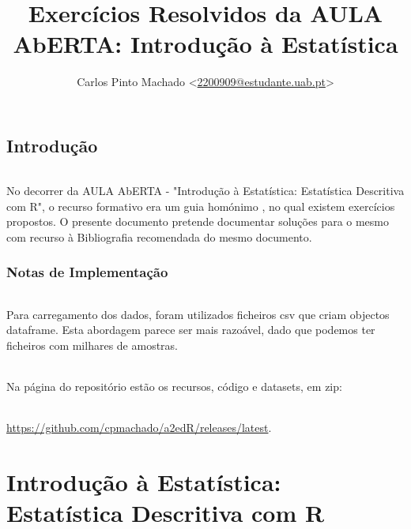 \documentclass[11pt,a4paper]{report}
\author{Carlos Pinto Machado
	<\href{mailto:2200909@estudante.uab.pt}{2200909@estudante.uab.pt}>}
\title{Exercícios Resolvidos da AULA AbERTA: Introdução à Estatística}
\begin{document}
\maketitle
\tableofcontents

\clearpage

\chapter*{Introdução}

\paragraph{} No decorrer da AULA AbERTA - "Introdução à Estatística:
Estatística Descritiva com R"\cite{AulaAbertaIntroducaoEstatistica2017}, o
recurso formativo era um guia homónimo
\cite{OliveiraAulaAberta2017}, no qual existem
exercícios propostos. O presente documento pretende documentar soluções para o
mesmo com recurso à Bibliografia recomendada do mesmo
documento\cite{OliveiraEstatisticaDescritiva2011}.

\section*{Notas de Implementação}

\paragraph{} Para carregamento dos dados, foram utilizados ficheiros csv que
criam objectos dataframe. Esta abordagem parece ser mais razoável, dado que
podemos ter ficheiros com milhares de amostras.

\paragraph{} Na página do repositório\cite{a2edRRepo}
estão os recursos, código e datasets, em zip:

\paragraph{}\url{https://github.com/cpmachado/a2edR/releases/latest}.


\part{Introdução à Estatística: Estatística Descritiva com R}
\end{document}
